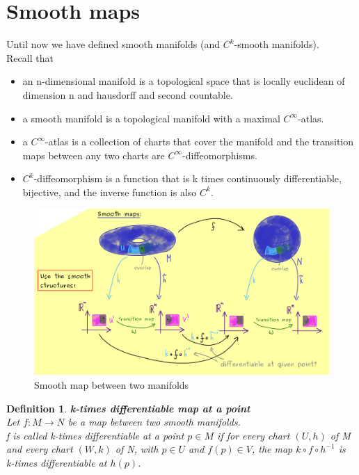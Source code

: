 \documentclass[11pt]{book} %
\newtheorem{definition}{Definition}[section]
\begin{document}
\section{Smooth maps}

Until now we have defined smooth manifolds (and \( C^k \)-smooth manifolds). \\
Recall that 
\begin{itemize}
    \item an n-dimensional manifold is a topological space that is locally euclidean of dimension n and hausdorff and second countable.
    \item a smooth manifold is a topological manifold with a maximal \( C^{\infty} \)-atlas.
    \item a \( C^{\infty} \)-atlas is a collection of charts that cover the manifold and the transition 
    maps between any two charts are \( C^{\infty} \)-diffeomorphisms.
    \item \( C^k \)-diffeomorphism is a function that is k times continuously differentiable, bijective, and the inverse function is also \( C^k \).
\end{itemize}

\begin{figure}
    \centering
    \includegraphics[width=\textwidth]{Figs/smooth_maps.png}
    \caption{Smooth map between two manifolds}
\end{figure}

\begin{definition}{\textbf{k-times differentiable map at a point}} \\
    Let \( f: M \to N \) be a map between two smooth manifolds. \\
    f is called k-times differentiable at a point \( p \in M \) if for every chart \( (U, h) \) of M and every chart \( (W, k) \) of N, 
    with \( p \in U \) and \( f(p) \in V \), the map \( k \circ f \circ h^{-1} \) is k-times differentiable at \( h(p) \).
\end{definition}
\end{document}
